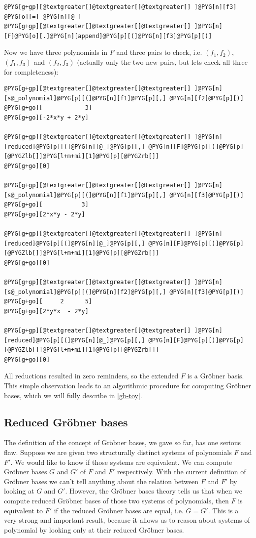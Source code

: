 \begin{Verbatim}[commandchars=@\[\]]
@PYG[g+gp][@textgreater[]@textgreater[]@textgreater[] ]@PYG[n][f3] @PYG[o][=] @PYG[n][@_]
@PYG[g+gp][@textgreater[]@textgreater[]@textgreater[] ]@PYG[n][F]@PYG[o][.]@PYG[n][append]@PYG[p][(]@PYG[n][f3]@PYG[p][)]
\end{Verbatim}
\noindent
Now we have three polynomials in $F$ and three pairs to check, i.e. $(f_1, f_2)$, $(f_1, f_3)$
and $(f_2, f_3)$ (actually only the two new pairs, but lets check all three for completeness):

\begin{Verbatim}[commandchars=@\[\]]
@PYG[g+gp][@textgreater[]@textgreater[]@textgreater[] ]@PYG[n][s@_polynomial]@PYG[p][(]@PYG[n][f1]@PYG[p][,] @PYG[n][f2]@PYG[p][)]
@PYG[g+go][            3]
@PYG[g+go][-2*x*y + 2*y]

@PYG[g+gp][@textgreater[]@textgreater[]@textgreater[] ]@PYG[n][reduced]@PYG[p][(]@PYG[n][@_]@PYG[p][,] @PYG[n][F]@PYG[p][)]@PYG[p][@PYGZlb[]]@PYG[l+m+mi][1]@PYG[p][@PYGZrb[]]
@PYG[g+go][0]

@PYG[g+gp][@textgreater[]@textgreater[]@textgreater[] ]@PYG[n][s@_polynomial]@PYG[p][(]@PYG[n][f1]@PYG[p][,] @PYG[n][f3]@PYG[p][)]
@PYG[g+go][           3]
@PYG[g+go][2*x*y - 2*y]

@PYG[g+gp][@textgreater[]@textgreater[]@textgreater[] ]@PYG[n][reduced]@PYG[p][(]@PYG[n][@_]@PYG[p][,] @PYG[n][F]@PYG[p][)]@PYG[p][@PYGZlb[]]@PYG[l+m+mi][1]@PYG[p][@PYGZrb[]]
@PYG[g+go][0]

@PYG[g+gp][@textgreater[]@textgreater[]@textgreater[] ]@PYG[n][s@_polynomial]@PYG[p][(]@PYG[n][f2]@PYG[p][,] @PYG[n][f3]@PYG[p][)]
@PYG[g+go][     2      5]
@PYG[g+go][2*y*x  - 2*y]

@PYG[g+gp][@textgreater[]@textgreater[]@textgreater[] ]@PYG[n][reduced]@PYG[p][(]@PYG[n][@_]@PYG[p][,] @PYG[n][F]@PYG[p][)]@PYG[p][@PYGZlb[]]@PYG[l+m+mi][1]@PYG[p][@PYGZrb[]]
@PYG[g+go][0]
\end{Verbatim}
\noindent
All reductions resulted in zero reminders, so the extended $F$ is a Gröbner basis. This simple
observation leads to an algorithmic procedure for computing Gröbner bases, which we will fully
describe in \ref{gb-toy}.


\subsection{Reduced Gröbner bases}

The definition of the concept of Gröbner bases, we gave so far, has one serious flaw. Suppose we
are given two structurally distinct systems of polynomials $F$ and $F'$. We would like to know if
those systems are equivalent. We can compute Gröbner bases $G$ and $G'$ of $F$ and $F'$ respectively.
With the current definition of Gröbner bases we can't tell anything about the relation between $F$
and $F'$ by looking at $G$ and $G'$. However, the Gröbner bases theory tells us that when we compute
reduced Gröbner bases of those two systems of polynomials, then $F$ is equivalent to $F'$ if the reduced
Gröbner bases are equal, i.e. $G = G'$. This is a very strong and important result, because it allows
us to reason about systems of polynomial by looking only at their reduced Gröbner bases.

